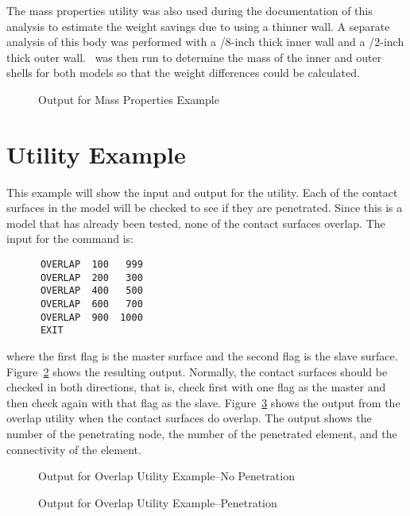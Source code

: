 The mass properties utility was also used during the documentation of
this analysis to estimate the weight savings due to using a thinner
wall.  A separate analysis of this body was performed with a
/8-inch thick inner wall and a /2-inch thick outer wall.
\numbers\ was then run to determine the mass of the inner and outer
shells for both models so that the weight differences could be
calculated.

\begin{figure}

\caption{Output for Mass Properties Example}\label{exmassout}
\end{figure}

\section{ Utility Example}
This example will show the input and output for the 
utility.  Each of the contact surfaces in the model will be checked to
see if they are penetrated.  Since this is a model that has already been
tested, none of the contact surfaces overlap.
The input for the command is:

\begin{verbatim}
      OVERLAP  100   999
      OVERLAP  200   300
      OVERLAP  400   500
      OVERLAP  600   700
      OVERLAP  900  1000
      EXIT
\end{verbatim}

where the first flag is the master surface and the second flag is the
slave surface. Figure~\ref{exoverlapout} shows the resulting output.
Normally, the contact surfaces should be checked in both directions,
that is, check first with one flag as the master and then check again
with that flag as the slave.  Figure~\ref{exoverlap2} shows the output
from the overlap utility when the contact surfaces do overlap.  The
output shows the number of the penetrating node, the number of the
penetrated element, and the connectivity of the element. 

\begin{figure}

\caption{Output for Overlap Utility Example--No
Penetration}\label{exoverlapout}
\end{figure}

\begin{figure}

\caption{Output for Overlap Utility
Example--Penetration}\label{exoverlap2} 
\end{figure}

